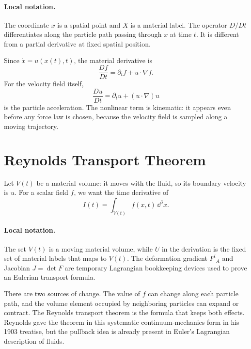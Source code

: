 \paragraph{Local notation.}
The coordinate \(x\) is a spatial point and \(X\) is a material label.  The
operator \(D/Dt\) differentiates along the particle path passing through
\(x\) at time \(t\).  It is different from a partial derivative at fixed
spatial position.

Since \(\dot x=u(x(t),t)\), the material derivative is
\[
  \boxed{
  \frac{D f}{D t}
  =
  \partial_t f+u\cdot\nabla f.
  }
\]
For the velocity field itself,
\[
  \frac{D u}{D t}
  =
  \partial_tu+(u\cdot\nabla)u
\]
is the particle acceleration. The nonlinear term is kinematic: it appears even
before any force law is chosen, because the velocity field is sampled along a
moving trajectory.

\section{Reynolds Transport Theorem}
\label{sec:reynolds-transport}

Let \(V(t)\) be a material volume: it moves with the fluid, so its boundary
velocity is \(u\). For a scalar field \(f\), we want the time derivative of
\[
  I(t)=\int_{V(t)} f(x,t)\,\dd^3x.
\]

\paragraph{Local notation.}
The set \(V(t)\) is a moving material volume, while \(U\) in the derivation is
the fixed set of material labels that maps to \(V(t)\).  The deformation
gradient \(F^i{}_A\) and Jacobian \(J=\det F\) are temporary Lagrangian
bookkeeping devices used to prove an Eulerian transport formula.

There are two sources of change. The value of \(f\) can change along each
particle path, and the volume element occupied by neighboring particles can
expand or contract. The Reynolds transport theorem is the formula that
keeps both effects.
Reynolds gave the theorem in this systematic continuum-mechanics form in his
1903 treatise, but the pullback idea is already present in Euler's Lagrangian
description of fluids.

